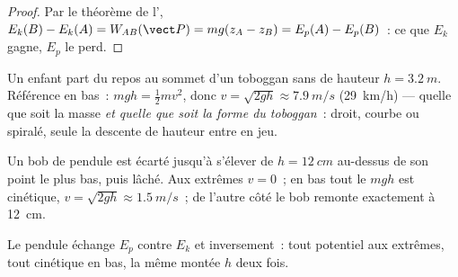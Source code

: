 \begin{proof}
Par le théorème de l', $E_k(B) - E_k(A) = W_{AB}(\vect P) = mg(z_A - z_B) =
E_p(A) - E_p(B)$~: ce que $E_k$ gagne, $E_p$ le perd.
\end{proof}

\begin{example}\label{ex:g11:mechanical-energy:slide}
Un enfant part du repos au sommet d'un toboggan sans  de
hauteur $h = \qty{3.2}{m}$. Référence en bas~: $mgh = \tfrac12 mv^2$,
donc $v = \sqrt{2gh} \approx \qty{7.9}{m/s}$ (\qty{29}{km/h}) ---
quelle que soit la masse \emph{et quelle que soit la forme du
toboggan}~: droit, courbe ou spiralé, seule la descente de hauteur
entre en jeu.
\end{example}

\begin{example}[Pendule]\label{ex:g11:mechanical-energy:pendulum}
Un bob de pendule est écarté jusqu'à s'élever de $h = \qty{12}{cm}$
au-dessus de son point le plus bas, puis lâché. Aux extrêmes $v = 0$~;
en bas tout le $mgh$ est cinétique, $v = \sqrt{2gh} \approx
\qty{1.5}{m/s}$~; de l'autre côté le bob remonte exactement à
\qty{12}{cm}.
\end{example}

\begin{omfigure}

{\small Le pendule échange $E_p$ contre $E_k$ et inversement~: tout
potentiel aux extrêmes, tout cinétique en bas, la même montée $h$ deux
fois.}
\end{omfigure}

